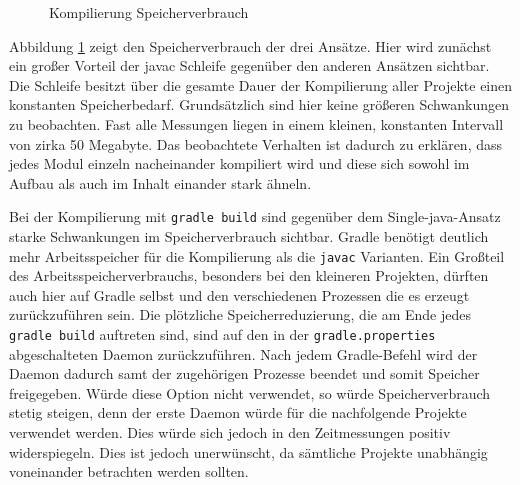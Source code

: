 \begin{figure}
	
	\caption{Kompilierung Speicherverbrauch}
	\label{fig:compile-memory}
\end{figure}

Abbildung \ref{fig:compile-memory} zeigt den Speicherverbrauch der drei Ansätze.
Hier wird zunächst ein großer Vorteil der javac Schleife gegenüber den anderen Ansätzen sichtbar.
Die Schleife besitzt über die gesamte Dauer der Kompilierung aller Projekte einen konstanten Speicherbedarf.
Grundsätzlich sind hier keine größeren Schwankungen zu beobachten.
Fast alle Messungen liegen in einem kleinen, konstanten Intervall von zirka 50 Megabyte.
Das beobachtete Verhalten ist dadurch zu erklären, dass jedes Modul einzeln nacheinander kompiliert wird und diese sich sowohl im Aufbau als auch im Inhalt einander stark ähneln.

Bei der Kompilierung mit \texttt{gradle build} sind gegenüber dem Single-java-Ansatz starke Schwankungen im Speicherverbrauch sichtbar.
Gradle benötigt deutlich mehr Arbeitsspeicher für die Kompilierung als die \texttt{javac} Varianten.
Ein Großteil des Arbeitsspeicherverbrauchs, besonders bei den kleineren Projekten, dürften auch hier auf Gradle selbst und den verschiedenen Prozessen die es erzeugt zurückzuführen sein.
Die plötzliche Speicherreduzierung, die am Ende jedes \texttt{gradle build} auftreten sind, sind auf den in der \texttt{gradle.properties} abgeschalteten Daemon zurückzuführen.
Nach jedem Gradle-Befehl wird der Daemon dadurch samt der zugehörigen Prozesse beendet und somit Speicher freigegeben.
Würde diese Option nicht verwendet, so würde Speicherverbrauch stetig steigen, denn der erste Daemon würde für die nachfolgende Projekte verwendet werden. Dies würde sich jedoch in den Zeitmessungen positiv widerspiegeln. 
Dies ist jedoch unerwünscht, da sämtliche Projekte unabhängig voneinander betrachten werden sollten.



